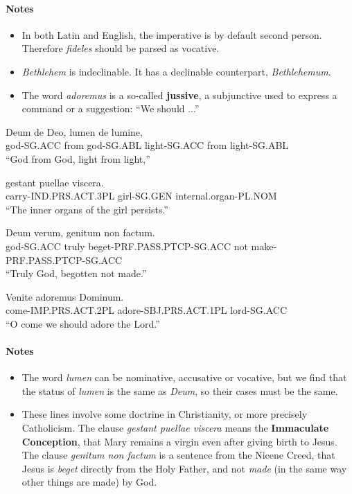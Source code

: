 \documentclass[a4paper]{article}
\newcommand*{\concept}[1]{{\textbf{#1}}}
\begin{document}
\paragraph{Notes} \begin{itemize}
    \item In both Latin and English, the imperative is by default second person. Therefore \emph{fideles} should be 
    parsed as vocative.
    \item \emph{Bethlehem} is indeclinable. It has a declinable counterpart, \emph{Bethlehemum}. 
    \item The word \emph{adoremus} is a so-called \concept{jussive}, a subjunctive used to express a command or a suggestion: ``We should ...''
\end{itemize}

\begin{exe}

\sn
\gll Deum        de     Deo,         lumen         de    lumine,  \\
    god-SG.ACC   from   god-SG.ABL   light-SG.ACC  from  light-SG.ABL \\
\glt ``God from God, light from light,''

\sn
\gll gestant                puellae      viscera.               \\
     carry-IND.PRS.ACT.3PL  girl-SG.GEN  internal.organ-PL.NOM  \\
\glt ``The inner organs of the girl persists.''

\sn
\gll Deum        verum,   genitum                    non  factum. \\
     god-SG.ACC  truly    beget-PRF.PASS.PTCP-SG.ACC not  make-PRF.PASS.PTCP-SG.ACC \\
\glt ``Truly God, begotten not made.''

\sn
\gll Venite                adoremus               Dominum. \\
     come-IMP.PRS.ACT.2PL  adore-SBJ.PRS.ACT.1PL  lord-SG.ACC \\
\glt ``O come we should adore the Lord.''

\end{exe}

\paragraph{Notes} \begin{itemize}
    \item The word \emph{lumen} can be nominative, accusative or vocative, 
    but we find that the status of \emph{lumen} is the same as \emph{Deum}, so their cases must be the same.
    \item These lines involve some doctrine in Christianity, or more precisely Catholicism. 
    The clause \emph{gestant puellae viscera} means the \concept{Immaculate Conception}, that Mary remains a virgin even after giving birth to Jesus. 
    The clause \emph{genitum non factum} is a sentence from the Nicene Creed, that Jesus is \emph{beget} directly from the Holy Father, 
    and not \emph{made} (in the same way other things are made) by God.
\end{itemize}
\end{document}
